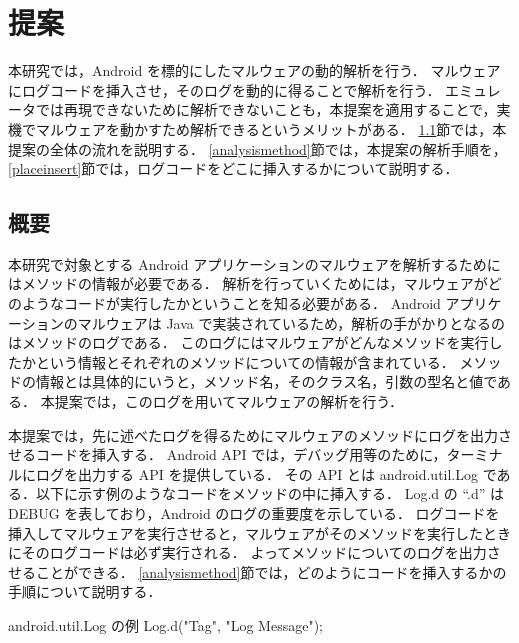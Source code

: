 \section{提案}
本研究では，Android を標的にしたマルウェアの動的解析を行う．
マルウェアにログコードを挿入させ，そのログを動的に得ることで解析を行う．
エミュレータでは再現できないために解析できないことも，本提案を適用することで，実機でマルウェアを動かすため解析できるというメリットがある．
\ref{overview}節では，本提案の全体の流れを説明する．
\ref{analysismethod}節では，本提案の解析手順を，\ref{placeinsert}節では，ログコードをどこに挿入するかについて説明する．

\subsection{概要}
\label{overview}
本研究で対象とする Android アプリケーションのマルウェアを解析するためにはメソッドの情報が必要である．
解析を行っていくためには，マルウェアがどのようなコードが実行したかということを知る必要がある．
Android アプリケーションのマルウェアは Java で実装されているため，解析の手がかりとなるのはメソッドのログである．
このログにはマルウェアがどんなメソッドを実行したかという情報とそれぞれのメソッドについての情報が含まれている．
メソッドの情報とは具体的にいうと，メソッド名，そのクラス名，引数の型名と値である．
本提案では，このログを用いてマルウェアの解析を行う．

本提案では，先に述べたログを得るためにマルウェアのメソッドにログを出力させるコードを挿入する．
Android API では，デバッグ用等のために，ターミナルにログを出力する API を提供している．
その API とは android.util.Log である．以下に示す例のようなコードをメソッドの中に挿入する．
Log.d の ``.d'' は DEBUG を表しており，Android のログの重要度を示している．
ログコードを挿入してマルウェアを実行させると，マルウェアがそのメソッドを実行したときにそのログコードは必ず実行される．
よってメソッドについてのログを出力させることができる．
 \ref{analysismethod}節では，どのようにコードを挿入するかの手順について説明する．

\begin{itembox}[c]{android.util.Log の例}
	Log.d("Tag", "Log Message");
\end{itembox}

